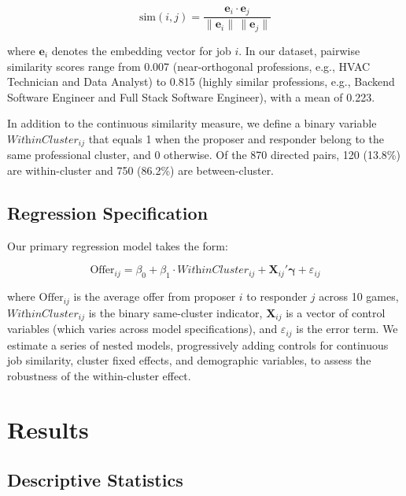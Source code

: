 \documentclass[12pt]{article}
\begin{document}
\begin{equation}
    \text{sim}(i, j) = \frac{\mathbf{e}_i \cdot \mathbf{e}_j}{\|\mathbf{e}_i\| \, \|\mathbf{e}_j\|}
\end{equation}

\noindent where $\mathbf{e}_i$ denotes the embedding vector for job $i$. In our dataset, pairwise similarity scores range from 0.007 (near-orthogonal professions, e.g., HVAC Technician and Data Analyst) to 0.815 (highly similar professions, e.g., Backend Software Engineer and Full Stack Software Engineer), with a mean of 0.223.

In addition to the continuous similarity measure, we define a binary variable $\textit{WithinCluster}_{ij}$ that equals 1 when the proposer and responder belong to the same professional cluster, and 0 otherwise. Of the 870 directed pairs, 120 (13.8\%) are within-cluster and 750 (86.2\%) are between-cluster.

\subsection{Regression Specification}

Our primary regression model takes the form:

\begin{equation}
    \text{Offer}_{ij} = \beta_0 + \beta_1 \cdot \textit{WithinCluster}_{ij} + \mathbf{X}_{ij}'\boldsymbol{\gamma} + \varepsilon_{ij}
    \label{eq:regression}
\end{equation}

\noindent where $\text{Offer}_{ij}$ is the average offer from proposer $i$ to responder $j$ across 10 games, $\textit{WithinCluster}_{ij}$ is the binary same-cluster indicator, $\mathbf{X}_{ij}$ is a vector of control variables (which varies across model specifications), and $\varepsilon_{ij}$ is the error term. We estimate a series of nested models, progressively adding controls for continuous job similarity, cluster fixed effects, and demographic variables, to assess the robustness of the within-cluster effect.

\section{Results}

\subsection{Descriptive Statistics}
\end{document}
